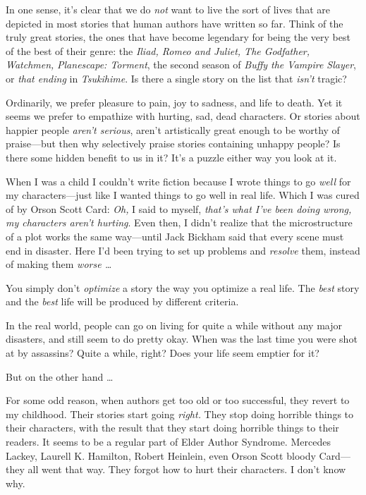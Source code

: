 {
 In one sense, it's clear that we do \textit{not}
want to live the sort of lives that are depicted in most stories that
human authors have written so far. Think of the truly great stories,
the ones that have become legendary for being the very best of the best
of their genre: the \textit{Iliad, Romeo and Juliet, The Godfather,
Watchmen,} \textit{Planescape: Torment}, the second season of
\textit{Buffy the Vampire Slayer}, or \textit{that ending} in
\textit{Tsukihime}. Is there a single story on the list that
\textit{isn't} tragic?}

{
 Ordinarily, we prefer pleasure to pain, joy to sadness, and life
to death. Yet it seems we prefer to empathize with hurting, sad, dead
characters. Or stories about happier people
\textit{aren't serious}, aren't
artistically great enough to be worthy of praise---but then why
selectively praise stories containing unhappy people? Is there some
hidden benefit to us in it? It's a puzzle either way
you look at it.}

{
 When I was a child I couldn't write fiction
because I wrote things to go \textit{well} for my characters---just
like I wanted things to go well in real life. Which I was cured of by
Orson Scott Card: \textit{Oh,} I said to myself,
\textit{that's what I've been doing
wrong, my characters aren't hurting}. Even then, I
didn't realize that the microstructure of a plot works
the same way---until Jack Bickham said that every scene must end in
disaster. Here I'd been trying to set up problems and
\textit{resolve} them, instead of making them \textit{worse \ldots}}

{
 You simply don't \textit{optimize} a story the way
you optimize a real life. The \textit{best} story and the \textit{best}
life will be produced by different criteria.}

{
 In the real world, people can go on living for quite a while
without any major disasters, and still seem to do pretty okay. When was
the last time you were shot at by assassins? Quite a while, right? Does
your life seem emptier for it?}

{
 But on the other hand \ldots}

{
 For some odd reason, when authors get too old or too successful,
they revert to my childhood. Their stories start going \textit{right.}
They stop doing horrible things to their characters, with the result
that they start doing horrible things to their readers. It seems to be
a regular part of Elder Author Syndrome. Mercedes Lackey, Laurell K.
Hamilton, Robert Heinlein, even Orson Scott bloody Card---they all went
that way. They forgot how to hurt their characters. I
don't know why.}

